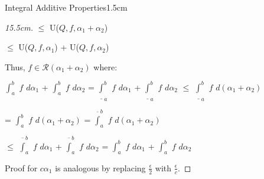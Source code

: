 \begin{ltheorem}{Integral Additive Properties}{1.5cm}
\begin{proof}[15.5cm]
            \hspace{5.1cm}
            $\leq$ U($Q,f,\alpha_1+\alpha_2$)

            \hspace{5.1cm}
            $\leq$ U($Q,f,\alpha_1$) + U($Q,f,\alpha_2$)

            Thus, $f \in \mathscr{R}(\alpha_1+\alpha_2)$ where:

            \hspace{0.5cm}
            $\int_a^b$ $f$ $d\alpha_1$ + $\int_a^b$ $f$ $d\alpha_2$
            = $\underline{\int}_a^b$ $f$ $d\alpha_1$
            + $\underline{\int}_a^b$ $f$ $d\alpha_2$
            $\leq$ $\underline{\int}_a^b$ $f$ $d(\alpha_1+\alpha_2)$

            \hspace{4.4cm}
            = $\int_a^b$ $f$ $d(\alpha_1+\alpha_2)$
            = $\overline{\int}_a^b$ $f$ $d(\alpha_1+\alpha_2)$

            \hspace{4.4cm}
            $\leq$ $\overline{\int}_a^b$ $f$ $d\alpha_1$
            + $\overline{\int}_a^b$ $f$ $d\alpha_2$
            = $\int_a^b$ $f$ $d\alpha_1$ + $\int_a^b$ $f$ $d\alpha_2$

            Proof for $c\alpha_1$ is analogous by replacing
            $\frac{\epsilon}{2}$ with $\frac{\epsilon}{c}$.
        \end{proof}
    \end{ltheorem}
    
    \newpage




